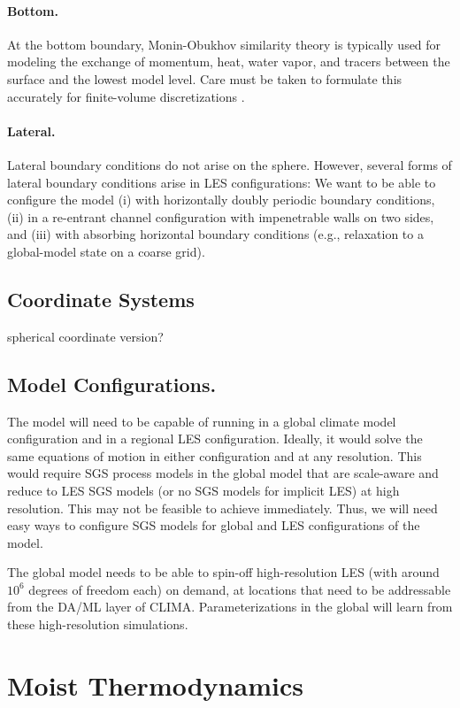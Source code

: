 \documentclass{article}
\begin{document}
\paragraph{Bottom.} At the bottom boundary, Monin-Obukhov similarity theory is typically used for modeling the exchange of momentum, heat, water vapor, and tracers between the surface and the lowest model level. Care must be taken to formulate this accurately for finite-volume discretizations  \citep{Nishizawa18a}.

\paragraph{Lateral.} Lateral boundary conditions do not arise on the sphere. However, several forms of lateral boundary conditions arise in LES configurations: We want to be able to configure the model (i) with horizontally doubly periodic boundary conditions, (ii) in a re-entrant channel configuration with impenetrable walls on two sides, and (iii) with absorbing horizontal boundary conditions (e.g., relaxation to a global-model state on a coarse grid). 

\subsection{Coordinate Systems}

spherical coordinate version? \citep{Staniforth03a}

\subsection{Model Configurations.} The model will need to be capable of running in a global climate model configuration and in a regional LES configuration. Ideally, it would solve the same equations of motion in either configuration and at any resolution. This would require SGS process models in the global model that are scale-aware and reduce to LES SGS models (or no SGS models for implicit LES) at high resolution. This may not be feasible to achieve immediately. Thus, we will need easy ways to configure SGS models for global and LES configurations of the model. 

The global model needs to be able to spin-off high-resolution LES (with around $10^6$ degrees of freedom each) on demand, at locations that need to be addressable from the DA/ML layer of CLIMA. Parameterizations in the global will learn from these high-resolution simulations. 

\section{Moist Thermodynamics}\label{s:thermodynamics}
\end{document}
